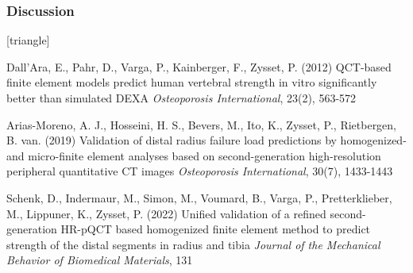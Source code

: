 \documentclass[xcolor=table,11pt]{beamer}
\begin{document}
	\begin{frame}
		\frametitle{Discussion}
		\footnotesize{
				\begin{thebibliography}{99}
						[triangle]

						 Dall'Ara, E., Pahr, D., Varga, P., Kainberger, F., Zysset, P. (2012)
						\newblock QCT-based finite element models predict human vertebral strength in vitro significantly better than simulated DEXA
						\newblock \textit{Osteoporosis International}, 23(2), 563-572

						 Arias-Moreno, A. J., Hosseini, H. S., Bevers, M., Ito, K., Zysset, P., Rietbergen, B. van. (2019)
						\newblock Validation of distal radius failure load predictions by homogenized- and micro-finite element analyses based on second-generation high-resolution peripheral quantitative CT images
						\newblock \textit{Osteoporosis International}, 30(7), 1433-1443

						Schenk, D., Indermaur, M., Simon, M., Voumard, B., Varga, P., Pretterklieber, M., Lippuner, K., Zysset, P. (2022)
						\newblock Unified validation of a refined second-generation HR-pQCT based homogenized finite element method to predict strength of the distal segments in radius and tibia
						\newblock \textit{Journal of the Mechanical Behavior of Biomedical Materials}, 131

						
					\end{thebibliography}
			}
	\end{frame}
	
	
\end{document}
